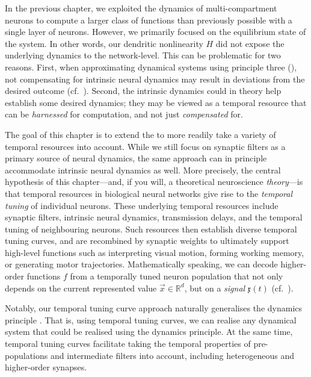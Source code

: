 
In the previous chapter, we exploited the dynamics of multi-compartment \nlif neurons to compute a larger class of functions than previously possible with a single layer of \LIF neurons.
However, we primarily focused on the equilibrium state of the \nlif system.
In other words, our dendritic nonlinearity $H$ did not expose the underlying dynamics to the network-level.
This can be problematic for two reasons.
First, when approximating dynamical systems using \NEF principle three (), not compensating for intrinsic neural dynamics may result in deviations from the desired outcome (cf.~).
Second, the intrinsic dynamics could in theory help establish some desired dynamics; they may be viewed as a temporal resource that can be \emph{harnessed} for computation, and not just \emph{compensated} for.

The goal of this chapter is to extend the \NEF to more readily take a variety of temporal resources into account.
While we still focus on synaptic filters as a primary source of neural dynamics, the same approach can in principle accommodate intrinsic neural dynamics as well.
More precisely, the central hypothesis of this chapter---and, if you will, a theoretical neuroscience \emph{theory}---is that temporal resources in biological neural networks give rise to the \emph{temporal tuning} of individual neurons.
These underlying temporal resources include synaptic filters, intrinsic neural dynamics, transmission delays, and the temporal tuning of neighbouring neurons.
Such resources then establish diverse temporal tuning curves, and are recombined by synaptic weights to ultimately support high-level functions such as interpreting visual motion, forming working memory, or generating motor trajectories.
Mathematically speaking, we can decode higher-order functions $f$ from a temporally tuned neuron population that not only depends on the current represented value $\vec x \in \mathbb{R}^d$, but on a \emph{signal} $\mathfrak{x}(t)$ (cf.~).

Notably, our temporal tuning curve approach naturally generalises the \NEF dynamics principle \citep[Chapter~8]{eliasmith2003neural}.
That is, using temporal tuning curves, we can realise any dynamical system that could be realised using the dynamics principle.
At the same time, temporal tuning curves facilitate taking the temporal properties of pre-populations and intermediate filters into account, including heterogeneous and higher-order synapses.

